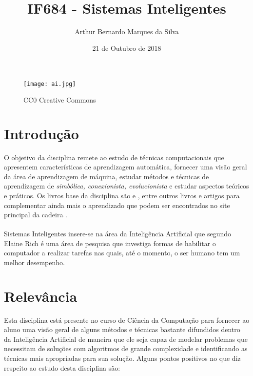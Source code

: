 \documentclass[10pt,a4paper]{article}
\title{IF684 - Sistemas Inteligentes}
\author{Arthur Bernardo Marques da Silva}
\date{21 de Outubro de 2018}
\begin{document}
\maketitle

\begin{figure}[h]
\centering
\texttt{[image: ai.jpg]}
\caption{\label{fig:ai}CC0 Creative Commons}
\end{figure}


\section{Introdução}
\paragraph{}O objetivo da disciplina remete ao estudo de técnicas computacionais que apresentem características de aprendizagem automática, fornecer uma visão geral da área de aprendizagem de máquina, estudar métodos e técnicas de aprendizagem de \textit{simbólica, conexionista, evolucionista} e estudar aspectos teóricos e práticos. Os livros base da disciplina são \cite{AI:ModernApproach} e \cite{AI:NewSynthesis}, entre outros livros e artigos para complementar ainda mais o aprendizado que podem ser encontrados no site principal da cadeira \cite{SiteCadeira}. \paragraph{} Sistemas Inteligentes insere-se na área da Inteligência Artificial que segundo Elaine Rich é uma área de pesquisa que investiga formas de habilitar o computador a realizar tarefas nas quais, até o momento, o ser humano tem um melhor desempenho. 

\section{Relevância}
\paragraph{}Esta disciplina está presente no curso de Ciência da Computação para fornecer ao aluno uma visão geral de alguns métodos e técnicas bastante difundidos dentro da Inteligência Artificial de maneira que ele seja capaz de modelar problemas que necessitam de soluções com algoritmos de grande complexidade e identificando as técnicas mais apropriadas para sua solução. Alguns pontos positivos no que diz respeito ao estudo desta disciplina são:
\end{document}
